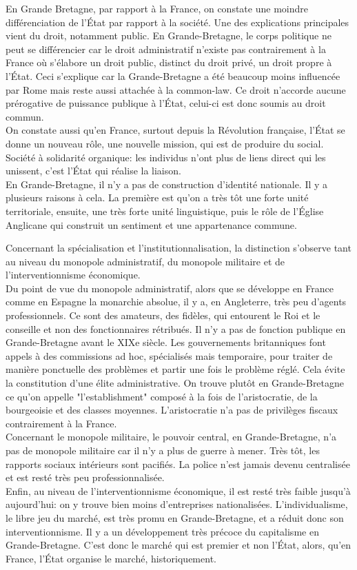 \documentclass[10pt, a4paper, openany]{book}
\begin{document}
En Grande Bretagne, par rapport à la France, on constate une moindre différenciation de l'État par rapport à la société. Une des explications principales vient du droit, notamment public. En Grande-Bretagne, le corps politique ne peut se différencier car le droit administratif n'existe pas contrairement à la France où s'élabore un droit public, distinct du droit privé, un droit propre à l'État. Ceci s'explique car la Grande-Bretagne a été beaucoup moins influencée par Rome mais reste aussi attachée à la common-law. Ce droit n'accorde aucune prérogative de puissance publique à l'État, celui-ci est donc soumis au droit commun. \\
On constate aussi qu'en France, surtout depuis la Révolution française, l'État se donne un nouveau rôle, une nouvelle mission, qui est de produire du social. Société à solidarité organique: les individus n'ont plus de liens direct qui les unissent, c'est l'État qui réalise la liaison. \\
En Grande-Bretagne, il n'y a pas de construction d'identité nationale. Il y a plusieurs raisons à cela. La première est qu'on a très tôt une forte unité territoriale, ensuite, une très forte unité linguistique, puis le rôle de l'Église Anglicane qui construit un sentiment et une appartenance commune.


Concernant la spécialisation et l'institutionnalisation, la distinction s'observe tant au niveau du monopole administratif, du monopole militaire et de l'interventionnisme économique. \\
Du point de vue du monopole administratif, alors que se développe en France comme en Espagne la monarchie absolue, il y a, en Angleterre, très peu d'agents professionnels. Ce sont des amateurs, des fidèles, qui entourent le Roi et le conseille et non des fonctionnaires rétribués. Il n'y a pas de fonction publique en Grande-Bretagne avant le XIXe siècle. Les gouvernements britanniques font appels à des commissions ad hoc, spécialisés mais temporaire, pour traiter de manière ponctuelle des problèmes et partir une fois le problème réglé. Cela évite la constitution d'une élite administrative. On trouve plutôt en Grande-Bretagne ce qu'on appelle "l'establishment" composé à la fois de l'aristocratie, de la bourgeoisie et des classes moyennes. L'aristocratie n'a pas de privilèges fiscaux contrairement à la France. \\
Concernant le monopole militaire, le pouvoir central, en Grande-Bretagne, n'a pas de monopole militaire car il n'y a plus de guerre à mener. Très tôt, les rapports sociaux intérieurs sont pacifiés. La police n'est jamais devenu centralisée et est resté très peu professionnalisée. \\
Enfin, au niveau de l'interventionnisme économique, il est resté très faible jusqu'à aujourd'hui: on y trouve bien moins d'entreprises nationalisées. L'individualisme, le libre jeu du marché, est très promu en Grande-Bretagne, et a réduit donc son interventionnisme. Il y a un développement très précoce du capitalisme en Grande-Bretagne. C'est donc le marché qui est premier et non l'État, alors, qu'en France, l'État organise le marché, historiquement. 
\end{document}
